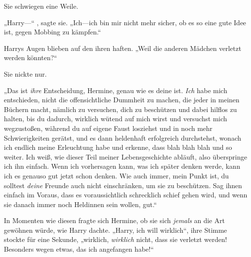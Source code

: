 Sie schwiegen eine Weile.

„Harry—“ , sagte sie. „Ich—ich bin mir nicht mehr sicher, ob es so eine gute Idee ist, gegen Mobbing zu kämpfen.“

Harrys Augen blieben auf den ihren haften. „Weil die anderen Mädchen verletzt werden könnten?“

Sie nickte nur.

„Das ist \emph{ihre} Entscheidung, Hermine, genau wie es deine ist. \emph{Ich} habe mich entschieden, nicht die offensichtliche Dummheit zu machen, die jeder in meinen Büchern macht, nämlich zu versuchen, dich zu beschützen und dabei hilflos zu halten, bis du dadurch, wirklich wütend auf mich wirst und versuchst mich wegzustoßen, während du auf eigene Faust losziehst und in noch mehr Schwierigkeiten gerätst, und es dann heldenhaft erfolgreich durchstehst, wonach ich endlich meine Erleuchtung habe und erkenne, dass blah blah blah und so weiter. Ich weiß, wie dieser Teil meiner Lebensgeschichte abläuft, also überspringe ich ihn einfach. Wenn ich vorhersagen kann, was ich später denken werde, kann ich es genauso gut jetzt schon denken. Wie auch immer, mein Punkt ist, du solltest \emph{deine} Freunde auch nicht einschränken, um sie zu beschützen. Sag ihnen einfach im Voraus, dass es voraussichtlich schrecklich schief gehen wird, und wenn sie danach immer noch Heldinnen sein wollen, gut.“

In Momenten wie diesen fragte sich Hermine, ob sie sich \emph{jemals} an die Art gewöhnen würde, wie Harry dachte. „Harry, ich will wirklich“, ihre Stimme stockte für eine Sekunde, „wirklich, \emph{wirklich} nicht, dass sie verletzt werden! Besonders wegen etwas, das ich angefangen habe!“

